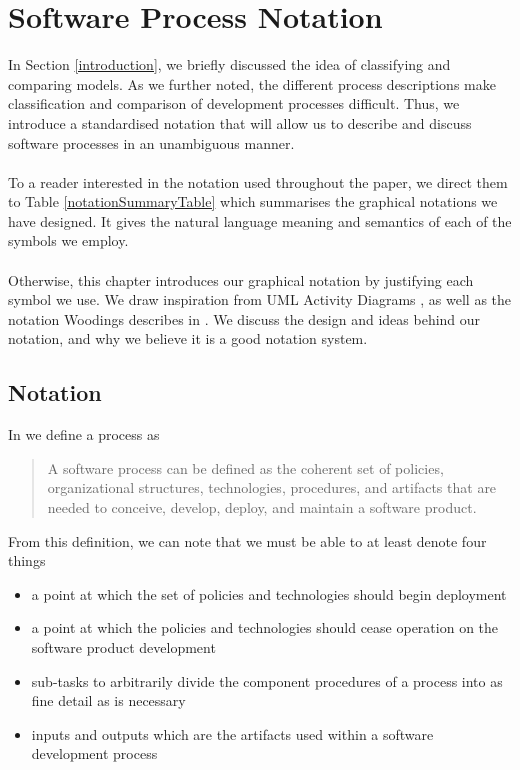 \section{Software Process Notation} \label{notation}

In Section \ref{introduction}, we briefly discussed the idea of classifying and comparing models.
As we further noted, the different process descriptions make classification and comparison of
development processes difficult.
Thus, we introduce a standardised notation that will allow us to describe and discuss software
processes in an unambiguous manner.\\
\\
To a reader interested in the notation used throughout the paper, we direct them
to Table \ref{notationSummaryTable} which summarises the graphical notations we have
designed.
It gives the natural language meaning and semantics of each of the symbols we employ.\\
\\
Otherwise, this chapter introduces our graphical notation by justifying each symbol we
use.
We draw inspiration from UML Activity Diagrams \cite{Dumas01umlactivity,BellUMLBasics}, as well as
the notation Woodings describes in \cite{Woodings2013Tut1}.
We discuss the design and ideas behind our notation, and why we believe it is a
good notation system.
\subsection{Notation}

In \cite{fuggetta2000software} we define a process as
\begin{quote}
A software process can be defined as the coherent set of policies, organizational structures,
	technologies, procedures, and artifacts that are needed to conceive, develop, deploy, and maintain
	a software product.
\end{quote}

From this definition, we can note that we must be able to at least denote four things
\begin{itemize}
	\item a point at which the set of policies and technologies should begin deployment
	\item a point at which the policies and technologies should cease operation on the software
	product development
	\item sub-tasks to arbitrarily divide the component procedures of a process into as fine detail as
	is necessary
	\item inputs and outputs which are the artifacts used within a software development process
\end{itemize}

